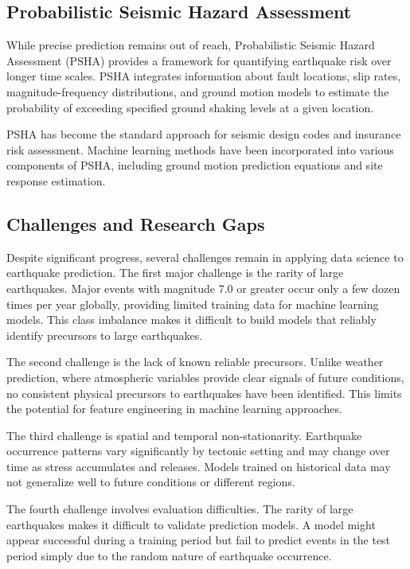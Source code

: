 \subsection{Probabilistic Seismic Hazard Assessment}

While precise prediction remains out of reach, Probabilistic Seismic Hazard Assessment (PSHA) provides a framework for quantifying earthquake risk over longer time scales. PSHA integrates information about fault locations, slip rates, magnitude-frequency distributions, and ground motion models to estimate the probability of exceeding specified ground shaking levels at a given location.

PSHA has become the standard approach for seismic design codes and insurance risk assessment. Machine learning methods have been incorporated into various components of PSHA, including ground motion prediction equations and site response estimation.

\subsection{Challenges and Research Gaps}

Despite significant progress, several challenges remain in applying data science to earthquake prediction. The first major challenge is the rarity of large earthquakes. Major events with magnitude 7.0 or greater occur only a few dozen times per year globally, providing limited training data for machine learning models. This class imbalance makes it difficult to build models that reliably identify precursors to large earthquakes.

The second challenge is the lack of known reliable precursors. Unlike weather prediction, where atmospheric variables provide clear signals of future conditions, no consistent physical precursors to earthquakes have been identified. This limits the potential for feature engineering in machine learning approaches.

The third challenge is spatial and temporal non-stationarity. Earthquake occurrence patterns vary significantly by tectonic setting and may change over time as stress accumulates and releases. Models trained on historical data may not generalize well to future conditions or different regions.

The fourth challenge involves evaluation difficulties. The rarity of large earthquakes makes it difficult to validate prediction models. A model might appear successful during a training period but fail to predict events in the test period simply due to the random nature of earthquake occurrence.

